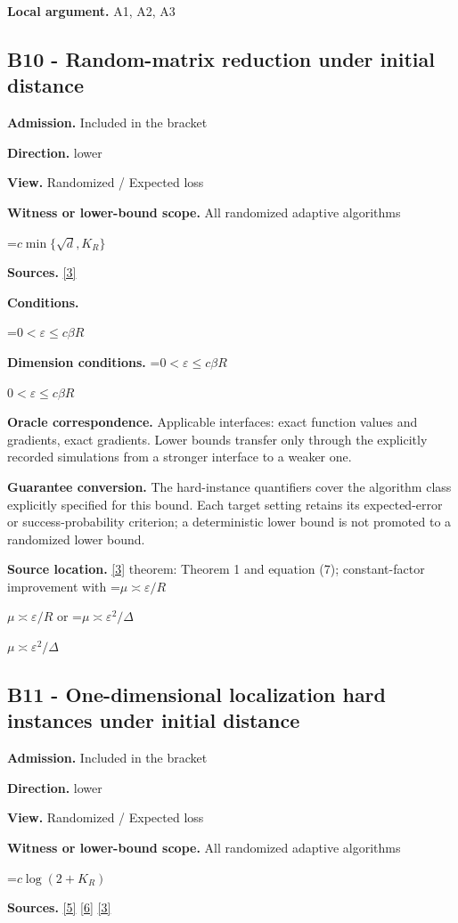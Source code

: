 \documentclass[10pt,a4paper]{article}
\newcommand{\AtlasMath}[1]{\par\begingroup\centering\setbox0=\hbox{$\displaystyle #1$}\ifdim\wd0>1.4\linewidth\typeout{ATLAS WIDE FORMULA: \the\wd0}\fi\ifdim\wd0>\linewidth\resizebox{\linewidth}{!}{\box0}\else\box0\fi\par\endgroup}
\newcommand{\AtlasInlineMath}[1]{\begingroup\setbox0=\hbox{$#1$}\ifdim\wd0>.4\linewidth\endgroup\AtlasMath{#1}\else\endgroup$#1$\fi}
\begin{document}
\textbf{Local argument.} A1, A2, A3

\subsection{B10 - Random-matrix reduction under initial distance}
\textbf{Admission.} Included in the bracket

\textbf{Direction.} lower

\textbf{View.} Randomized / Expected loss

\textbf{Witness or lower-bound scope.} All randomized adaptive algorithms

\AtlasMath{c\min\{\sqrt d,K_R\}}
\textbf{Sources.} \href{https://arxiv.org/pdf/2609.10874}{[3]}

\textbf{Conditions.} 
\AtlasMath{0<\varepsilon\le c\beta R}


\textbf{Dimension conditions.} \AtlasInlineMath{0<\varepsilon\le c\beta R}

\textbf{Oracle correspondence.} Applicable interfaces: exact function values and gradients, exact gradients. Lower bounds transfer only through the explicitly recorded simulations from a stronger interface to a weaker one.

\textbf{Guarantee conversion.} The hard-instance quantifiers cover the algorithm class explicitly specified for this bound. Each target setting retains its expected-error or success-probability criterion; a deterministic lower bound is not promoted to a randomized lower bound.

\textbf{Source location.} \href{https://arxiv.org/pdf/2609.10874}{[3]} theorem: Theorem 1 and equation (7); constant-factor improvement with \AtlasInlineMath{\mu\asymp\varepsilon/R} or \AtlasInlineMath{\mu\asymp\varepsilon^2/\Delta}

\subsection{B11 - One-dimensional localization hard instances under initial distance}
\textbf{Admission.} Included in the bracket

\textbf{Direction.} lower

\textbf{View.} Randomized / Expected loss

\textbf{Witness or lower-bound scope.} All randomized adaptive algorithms

\AtlasMath{c\log(2+K_R)}
\textbf{Sources.} \href{https://arxiv.org/pdf/2101.09740v2}{[5]} \href{https://arxiv.org/pdf/2609.33360v2}{[6]} \href{https://arxiv.org/pdf/2609.10874}{[3]}
\end{document}
